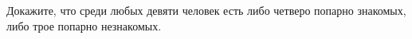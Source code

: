 Докажите, что среди любых девяти человек есть либо четверо попарно знакомых, либо трое попарно незнакомых.